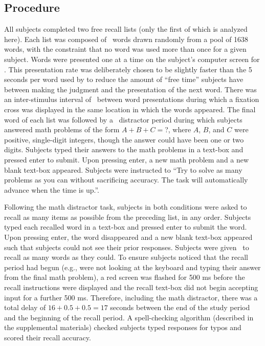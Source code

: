 \documentclass[jou,natbib,floatsintext]{apa6} %
\begin{document}
\subsection{Procedure}
All subjects completed two free recall lists (only the first of which is analyzed here). Each list was composed of \listlength~words drawn randomly from a pool of 1638 words, with the constraint that no word was used more than once for a given subject. Words were presented one at a time on the subject's computer screen for \presrate. This presentation rate was deliberately chosen to be slightly faster than the 5 seconds per word used by \citet{NairEtal17} to reduce the amount of ``free time'' subjects have between making the judgment and the presentation of the next word.
There was an inter-stimulus interval of \isi~between word presentations during which a fixation cross was displayed in the same location in which the words appeared. The final word of each list was followed by a \DFRDelay~distractor period during which subjects answered math problems of the form $A+B+C=$?, where $A$, $B$, and $C$ were positive, single-digit integers, though the answer could have been one or two digits. Subjects typed their answers to the math problems in a text-box and pressed enter to submit. Upon pressing enter, a new math problem and a new blank text-box appeared. Subjects were instructed to ``Try to solve as many problems as you can without sacrificing accuracy. The task will automatically advance when the time is up.''.

Following the math distractor task, subjects in both conditions were asked to recall as many items as possible from the preceding list, in any order. Subjects typed each recalled word in a text-box and pressed enter to submit the word. Upon pressing enter, the word disappeared and a new blank text-box appeared such that subjects could not see their prior responses. Subjects were given \recalltime~to recall as many words as they could. To ensure subjects noticed that the recall period had begun (e.g., were not looking at the keyboard and typing their answer from the final math problem), a red screen was flashed for 500 ms before the recall instructions were displayed and the recall text-box did not begin accepting input for a further 500 ms. Therefore, including the math distractor, there was a total delay of $16+0.5+0.5=17$ seconds between the end of the study period and the beginning of the recall period. A spell-checking algorithm (described in the supplemental materials) checked subjects typed responses for typos and scored their recall accuracy.
\end{document}
